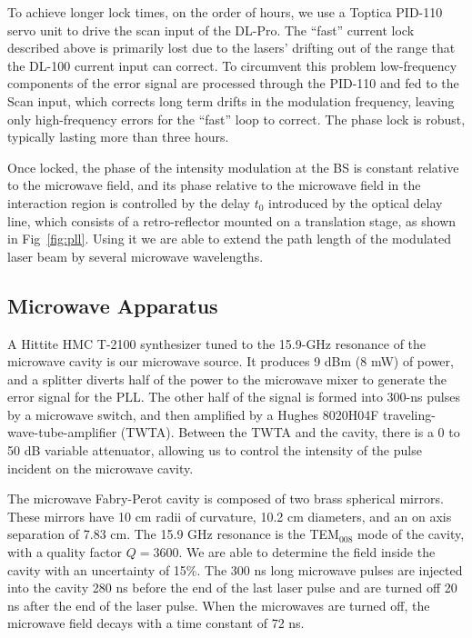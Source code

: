 \documentclass[aps,pra,reprint,groupedaddress]{revtex4-1}
\begin{document}
To achieve longer lock times, on the order of hours, we use a Toptica PID-110 servo unit to drive the scan input of the DL-Pro. The ``fast'' current lock described above is primarily lost due to the lasers' drifting out of the range that the DL-100 current input can correct. To circumvent this problem low-frequency components of the error signal are processed through the PID-110 and fed to the Scan input, which corrects long term drifts in the modulation frequency, leaving only high-frequency errors for the ``fast'' loop to correct. The phase lock is robust, typically lasting more than three hours.

Once locked, the phase of the intensity modulation at the BS is constant relative to the microwave field, and its phase relative to the microwave field in the interaction region is controlled by the delay $t_0$ introduced by the optical delay line, which consists of a retro-reflector mounted on a translation stage, as shown in Fig~\ref{fig:pll}. Using it we are able to extend the path length of the modulated laser beam by several microwave wavelengths.

\subsection{\label{cavity} Microwave Apparatus}

A Hittite HMC T-2100 synthesizer tuned to the 15.9-GHz resonance of the microwave cavity is our microwave source. It produces 9 dBm (8 mW) of power, and a splitter diverts half of the power to the microwave mixer to generate the error signal for the PLL. The other half of the signal is formed into 300-ns pulses by a microwave switch, and then amplified by a Hughes 8020H04F traveling-wave-tube-amplifier (TWTA). Between the TWTA and the cavity, there is a 0 to 50 dB variable attenuator, allowing us to control the intensity of the pulse incident on the microwave cavity.

The microwave Fabry-Perot cavity is composed of two brass spherical mirrors. These mirrors have 10 cm radii of curvature, 10.2 cm diameters, and an on axis separation of 7.83 cm. The 15.9 GHz resonance is the TEM$_{008}$ mode of the cavity, with a quality factor $Q=3600$. We are able to determine the field inside the cavity with an uncertainty of 15\%. The 300 ns long microwave pulses are injected into the cavity 280 ns before the end of the last laser pulse and are turned off 20 ns after the end of the laser pulse. When the microwaves are turned off, the microwave field decays with a time constant of 72 ns.
\end{document}
